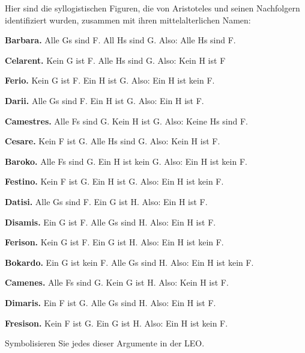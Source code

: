\practiceproblems
\problempart
\label{pr.BarbaraEtc}
Hier sind die syllogistischen Figuren, die von Aristoteles und seinen Nachfolgern identifiziert wurden, zusammen mit ihren mittelalterlichen Namen:
\begin{earg}
	\item \textbf{Barbara.} Alle Gs sind F. All Hs sind G. Also:  Alle Hs sind F.
	\item \textbf{Celarent.} Kein G ist F. Alle Hs sind G. Also: Kein H ist F
	\item \textbf{Ferio.} Kein G ist F. Ein H ist G. Also: Ein H ist kein F.
	\item \textbf{Darii.} Alle Gs sind F. Ein H ist G. Also: Ein H ist F.
	\item \textbf{Camestres.} Alle Fs sind G. Kein H ist G. Also: Keine Hs sind F.
	\item \textbf{Cesare.} Kein F ist G. Alle Hs sind G. Also: Kein H ist F.
	\item \textbf{Baroko.} Alle Fs sind G. Ein H ist kein G. Also: Ein H ist kein F.
	\item \textbf{Festino.} Kein F ist G. Ein H ist G. Also: Ein H ist kein F.
	\item \textbf{Datisi.} Alle Gs sind F. Ein G ist H. Also: Ein H ist F.
	\item \textbf{Disamis.} Ein G ist F. Alle Gs sind H. Also: Ein H ist F.
	\item \textbf{Ferison.} Kein G ist F. Ein G ist H. Also: Ein H ist kein F.
	\item \textbf{Bokardo.} Ein G ist kein F. Alle Gs sind H. Also: Ein H ist kein F.
	\item \textbf{Camenes.} Alle Fs sind G. Kein G ist H. Also: Kein H ist F.
	\item \textbf{Dimaris.} Ein F ist G. Alle Gs sind H. Also: Ein H ist F.
	\item \textbf{Fresison.} Kein F ist G. Ein G ist H. Also: Ein H ist kein F.
\end{earg}
Symbolisieren Sie jedes dieser Argumente in der LEO.

\

